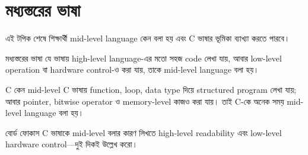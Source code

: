 \section{মধ্যস্তরের ভাষা}

\begin{learningbox}
এই টপিক শেষে শিক্ষার্থী mid-level language কেন বলা হয় এবং C ভাষার ভূমিকা ব্যাখ্যা করতে পারবে।
\end{learningbox}

\begin{definitionbox}{মধ্যস্তরের ভাষা}
যে ভাষায় high-level language-এর মতো সহজ code লেখা যায়, আবার low-level operation বা hardware control-ও করা যায়, তাকে mid-level language বলা হয়।
\end{definitionbox}

\begin{examplebox}{C কেন mid-level}
C ভাষায় function, loop, data type দিয়ে structured program লেখা যায়; আবার pointer, bitwise operator ও memory-level কাজও করা যায়। তাই C-কে অনেক সময় mid-level language বলা হয়।
\end{examplebox}

\begin{boardbox}{বোর্ড ফোকাস}
C ভাষাকে mid-level বলার কারণ লিখতে high-level readability এবং low-level hardware control—দুই দিকই উল্লেখ করো।
\end{boardbox}
